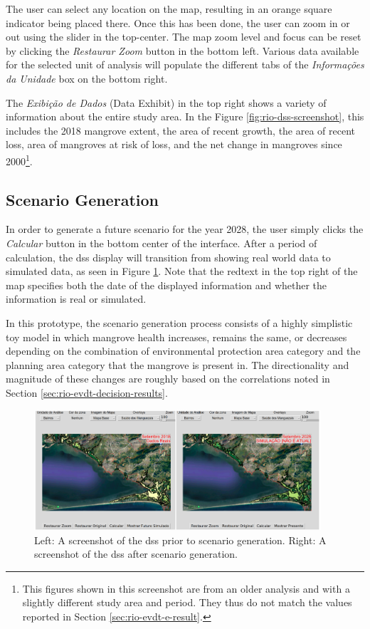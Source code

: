 The user can select any location on the map, resulting in an orange square indicator being placed there. Once this has been done, the user can zoom in or out using the slider in the top-center. The map zoom level and focus can be reset by clicking the \textit{Restaurar Zoom} button in the bottom left. Various data available for the selected unit of analysis will populate the different tabs of the \textit{Informações da Unidade} box on the bottom right. 

The \textit{Exibição de Dados} (Data Exhibit) in the top right shows a variety of information about the entire study area. In the Figure \ref{fig:rio-dss-screenshot}, this includes the 2018 mangrove extent, the area of recent growth, the area of recent loss, area of mangroves at risk of loss, and the net change in mangroves since 2000\footnote{This figures shown in this screenshot are from an older analysis and with a slightly different study area and period. They thus do not match the values reported in Section \ref{sec:rio-evdt-e-result}.}. 

\subsection{Scenario Generation}

In order to generate a future scenario for the year 2028, the user simply clicks the \textit{Calcular} button in the bottom center of the interface. After a period of calculation, the \ac{dss} display will transition from showing real world data to simulated data, as seen in Figure \ref{fig:rio-dss-simulation}. Note that the redtext in the top right of the map specifies both the date of the displayed information and whether the information is real or simulated.

In this prototype, the scenario generation process consists of a highly simplistic toy model in which mangrove health increases, remains the same, or decreases depending on the combination of environmental protection area category and the planning area category that the mangrove is present in. The directionality and magnitude of these changes are roughly based on the correlations noted in Section \ref{sec:rio-evdt-decision-results}. 

\begin{figure}[!htb] 
\centering
\includegraphics[width=0.95\textwidth]{Figures/chap4/rio-dss-simulation.png}
\caption[Demonstration of the Rio DSS Scenario Generation]{Left: A screenshot of the \ac{dss} prior to scenario generation. Right: A screenshot of the \ac{dss} after scenario generation.}
\label{fig:rio-dss-simulation}
\end{figure}

